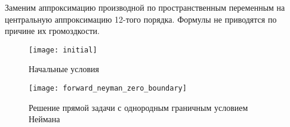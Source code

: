 Заменим аппроксимацию производной по пространственным переменным
на центральную аппроксимацию 12-того порядка.
Формулы не приводятся по причине их громоздкости.

\begin{figure}
    \caption{Начальные условия}
\noindent\texttt{[image: initial]}
\end{figure}

\begin{figure}
    \caption{Решение прямой задачи с однородным граничным условием Неймана}
\noindent\texttt{[image: forward\_neyman\_zero\_boundary]}
\end{figure}
